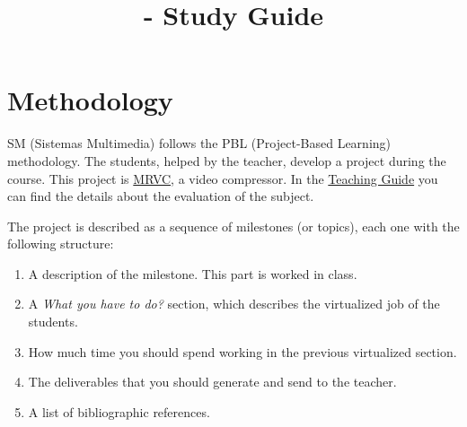 
\title{\SM - Study Guide}

\maketitle

\section{Methodology}
SM (Sistemas Multimedia) follows the PBL (Project-Based Learning)
methodology. The students, helped by the teacher, develop a project
during the course. This project is
\href{https://github.com/Sistemas-Multimedia/MRVC}{MRVC}, a video
compressor. In the
\href{http://portafirma.ual.es/pfirma/downloadReport/file?idDocument=Y3iGKKA5Lb&idRequest=vo8X8SLOXQ}{Teaching
  Guide} you can find the details about the evaluation of the subject.

The project is described as a sequence of milestones (or topics), each
one with the following structure:
\begin{enumerate}
\item A description of the milestone. This part is worked in class.
\item A \emph{What you have to do?} section, which describes the
  virtualized job of the students.
\item How much time you should spend working in the previous
  virtualized section.
\item The deliverables that you should generate and send to the
  teacher.
\item A list of bibliographic references.
\end{enumerate}

